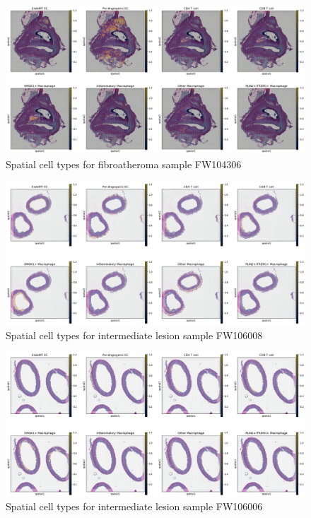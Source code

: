 \documentclass[a4paper,12pt]{article}
\begin{document}
\begin{figure}[h]
    \centering
    \includegraphics[width=1.1\textwidth]{spatialFibroatheroma2}
    \caption{Spatial cell types for fibroatheroma sample FW104306}
    \label{fig:appendix1}
\end{figure}
\begin{figure}[h]
    \centering
    \includegraphics[width=1.1\textwidth]{spatialIntermediateLesion1}
    \caption{Spatial cell types for intermediate lesion sample FW106008}
    \label{fig:appendix1}
\end{figure}
\begin{figure}[h]
    \centering
    \includegraphics[width=1.1\textwidth]{spatialIntermediateLesion2}
    \caption{Spatial cell types for intermediate lesion sample FW106006}
    \label{fig:appendix1}
\end{figure}
\end{document}
